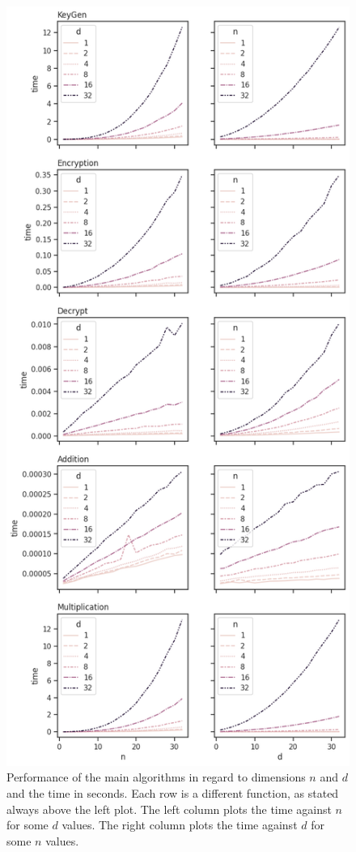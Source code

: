 \begin{figure}[ht!]
  \centering
  \includegraphics[scale=0.5]{images/nd-performance.png}
  \caption[Performance of the HE algorithms by $n$ and $d$]{Performance of the main algorithms in regard to dimensions $n$ and $d$ and the time in seconds. Each row is a different function, as stated always above the left plot. The left column plots the time against $n$ for some $d$ values. The right column plots the time against $d$ for some $n$ values.}
  \label{fig:nd-performance}
\end{figure}

